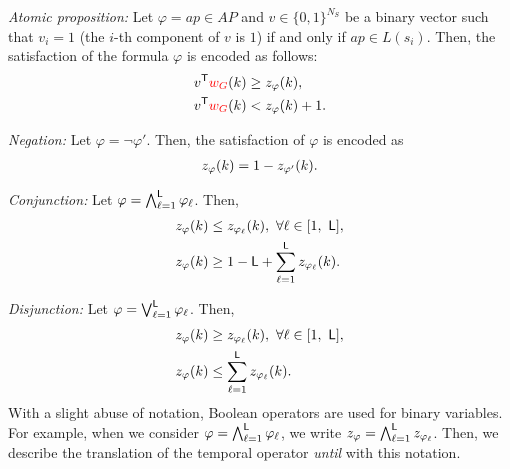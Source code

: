 \documentclass[journal,twoside,web]{IEEEtran}
\newcommand{\req}[1]{\eqref{#1}}
\newcommand{\Len}{{\sf L}}
\newcommand{\red}[1]{\textcolor{red}{#1}}
\begin{document}
\textit{Atomic proposition:} Let $\varphi = ap \in AP$ and $v \in \{0, 1\}^{N_S}$ be a binary vector such that $v_i = 1$ (the $i$-th component of $v$ is $1$) if and only if $ap \in L(s_i)$. Then, the satisfaction of the formula $\varphi$ is encoded as follows: 
\begin{align}
v^\mathsf{T} \red{w_G}(k) &\geq z_\varphi (k),\notag\\
v^\mathsf{T} \red{w_G}(k) &< z_\varphi (k)+1. \notag
\end{align}

\textit{Negation:} Let $\varphi = \neg \varphi'$. Then, the satisfaction of $\varphi$ is encoded as 
\begin{align}\notag
z_\varphi (k) = 1 - z_{\varphi'} (k). 
\end{align}

\textit{Conjunction:} Let $\varphi = \bigwedge^{\Len} _{\ell=1} \varphi_\ell$. Then, 
\begin{align}
\label{translate_con}
z_\varphi (k) &\leq z_{\varphi_\ell} (k),\ \forall \ell \in [1,\ \Len], \notag \\ 
z_\varphi (k) & \geq 1-\Len + \sum_{\ell=1}^{\Len} z_{\varphi_\ell} (k). \notag
\end{align}

\textit{Disjunction:} Let $\varphi = \bigvee^{\Len} _{\ell=1} \varphi_\ell$. 
Then, 
\begin{align}
z_\varphi (k) &\geq z_{\varphi_\ell} (k),\ \forall \ell \in [1,\ \Len], \notag \\ 
z_\varphi (k) & \leq \sum_{\ell=1}^{\Len} z_{\varphi_\ell} (k). \notag
\end{align}
With a slight abuse of notation, Boolean operators are used for binary variables. For example, when we consider $\varphi = \bigwedge^\Len _{\ell=1} \varphi_\ell$, we write $z_\varphi = \bigwedge^{\Len} _{\ell=1} z_{\varphi_\ell}$. %
Then, we describe the translation of the temporal operator \textit{until} with this notation.
\end{document}
